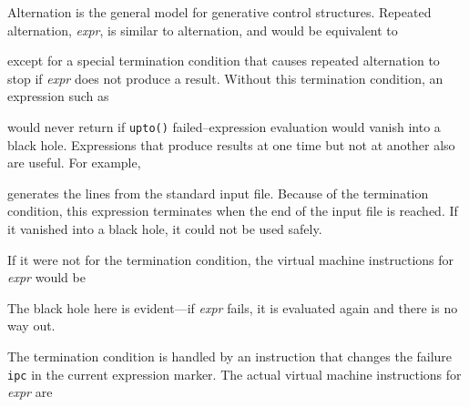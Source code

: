 Alternation is the general model for generative control
structures. Repeated alternation, \texttt{{\textbar}}\textit{expr}, is
similar to alternation, and would be equivalent to


\noindent except for a special termination condition that causes
repeated alternation to stop if \textit{expr} does not produce a
result. Without this termination condition, an expression such as


\noindent would never return if \texttt{upto()} failed--expression
evaluation would vanish into a {\textquotedbl}black
hole.{\textquotedbl} Expressions that produce results at one time but
not at another also are useful. For example,


\noindent generates the lines from the standard input file. Because of
the termination condition, this expression terminates when the end of
the input file is reached. If it vanished into a {\textquotedbl}black
hole,{\textquotedbl} it could not be used safely.

If it were not for the termination condition, the virtual machine
instructions for \texttt{{\textbar}}\textit{expr} would be

\goodbreak
{}

The {\textquotedbl}black hole{\textquotedbl} here is evident---if
\textit{expr} fails, it is evaluated again and there is no way out.

The termination condition is handled by an instruction that changes
the failure \texttt{ipc} in the current expression marker. The actual
virtual machine instructions for \texttt{{\textbar}}\textit{expr} are

\goodbreak
{}

